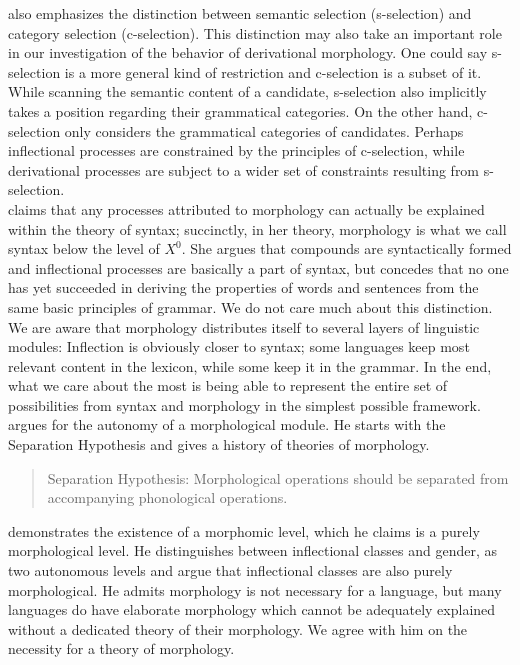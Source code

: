 \documentclass[11pt]{article} %
\begin{document}
\citet{Sezer1991} also emphasizes the distinction between semantic selection (s-selection) and category selection (c-selection). This distinction may also take an important role in our investigation of the behavior of derivational morphology. One could say s-selection is a more general kind of restriction and c-selection is a subset of it. While scanning the semantic content of a candidate, s-selection also implicitly takes a position regarding their grammatical categories. On the other hand, c-selection only considers the grammatical categories of candidates. Perhaps inflectional processes are constrained by the principles of c-selection, while derivational processes are subject to a wider set of constraints resulting from s-selection. \\

\citet{Lieber1992} claims that any processes attributed to morphology can actually be explained within the theory of syntax; succinctly, in her theory, morphology is what we call syntax below the level of $X^0$. She argues that compounds are syntactically formed and inflectional processes are basically a part of syntax, but concedes that no one has yet succeeded in deriving the properties of words and sentences from the same basic principles of grammar. We do not care much about this distinction. We are aware that morphology distributes itself to several layers of linguistic modules: Inflection is obviously closer to syntax; some languages keep most relevant content in the lexicon, while some keep it in the grammar. In the end, what we care about the most is being able to represent the entire set of possibilities from syntax and morphology in the simplest possible framework. \\ 

\citet{Aronoff1994} argues for the autonomy of a morphological module. He starts with the Separation Hypothesis and gives a history of theories of morphology.

\begin{quote}
	Separation Hypothesis: Morphological operations should be separated from accompanying phonological operations. 
\end{quote}

\citet{Aronoff1994} demonstrates the existence of a morphomic level, which he claims is a purely morphological level. He distinguishes between inflectional classes and gender, as two autonomous levels and argue that inflectional classes are also purely morphological. He admits morphology is not necessary for a language, but many languages do have elaborate morphology which cannot be adequately explained without a dedicated theory of their morphology. We agree with him on the necessity for a theory of morphology. \\
\end{document}

